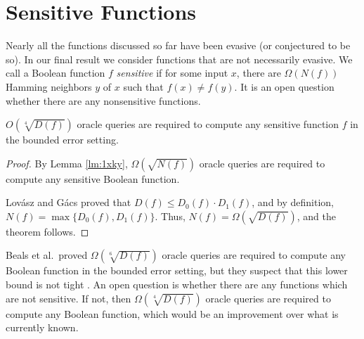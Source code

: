 \section{Sensitive Functions}
\label{sec:lqbcbf}

Nearly all the functions discussed so far have been evasive (or
conjectured to be so).  In our final result we consider functions that
are not necessarily evasive.  We call a Boolean function $f$
\emph{sensitive} if for some input $x$, there are $\Omega(N(f))$ Hamming
neighbors $y$ of $x$ such that $f(x) \neq f(y)$.  It is an open
question whether there are any nonsensitive functions.

\begin{theorem}
\label{th:b4r}
$O(\sqrt[4]{D(f)})$ oracle queries are required to compute any
sensitive function $f$ in the bounded error setting.
\end{theorem}

\begin{proof}
By Lemma \ref{lm:1xky}, $\Omega(\sqrt{N(f)})$ oracle queries are
required to compute any sensitive Boolean function. 

Lov{\'{a}}sz and G{\'{a}}cs \cite{lovasz94complexity} proved that
$D(f) \le D_{0}(f) \cdot D_{1}(f)$, and by definition, $N(f) =
\max\{D_{0}(f),D_{1}(f)\}$.  Thus, $N(f) = \Omega(\sqrt{D(f)})$, 
and the theorem follows.
\end{proof}

Beals et al.\ proved $\Omega(\sqrt[6]{D(f)})$ oracle
queries are required to compute any Boolean function in the bounded
error setting, but they suspect that this lower bound is not tight
\cite{beals98quantum}.  An open question is whether there are any 
functions which are not sensitive.  If not, then
$\Omega(\sqrt[4]{D(f)})$ oracle queries are required to compute any
Boolean function, which would be an improvement over what is currently
known.

